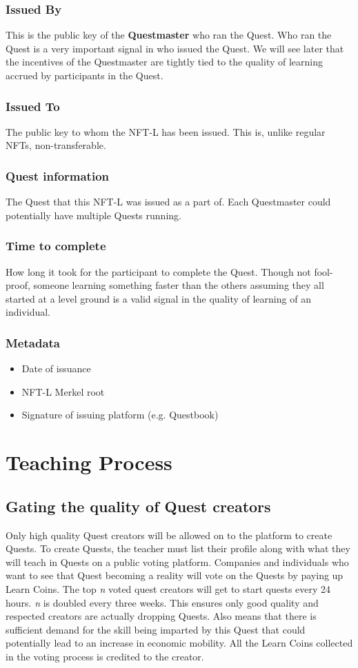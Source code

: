 \documentclass{article}
\begin{document}
      \subsubsection{Issued By}
        This is the public key of the \textbf{Questmaster} who ran the Quest. Who ran the Quest is a very important signal in who issued the Quest. We will see later that the incentives of the Questmaster are tightly tied to the quality of learning accrued by participants in the Quest. 
      \subsubsection{Issued To}
        The public key to whom the NFT-L has been issued. This is, unlike regular NFTs, non-transferable. 
      \subsubsection{Quest information}
        The Quest that this NFT-L was issued as a part of. Each Questmaster could potentially have multiple Quests running. 
      \subsubsection{Time to complete}
        How long it took for the participant to complete the Quest. Though not fool-proof, someone learning something faster than the others assuming they all started at a level ground is a valid signal in the quality of learning of an individual. 
      \subsubsection{Metadata}
        \begin{itemize}
          \item Date of issuance
          \item NFT-L Merkel root
          \item Signature of issuing platform (e.g. Questbook)
        \end{itemize}
  \section{Teaching Process}
    \subsection{Gating the quality of Quest creators}
      Only high quality Quest creators will be allowed on to the platform to create Quests. To create Quests, the teacher must list their profile along with what they will teach in Quests on a public voting platform.
      Companies and individuals who want to see that Quest becoming a reality will vote on the Quests by paying up Learn Coins. The top \textit{n} voted quest creators will get to start quests every 24 hours. 
      \break
      \textit{n} is doubled every three weeks.
      \break
      This ensures only good quality and respected creators are actually dropping Quests. Also means that there is sufficient demand for the skill being imparted by this Quest that could potentially lead to an increase in economic mobility.
      All the Learn Coins collected in the voting process is credited to the creator.
\end{document}
